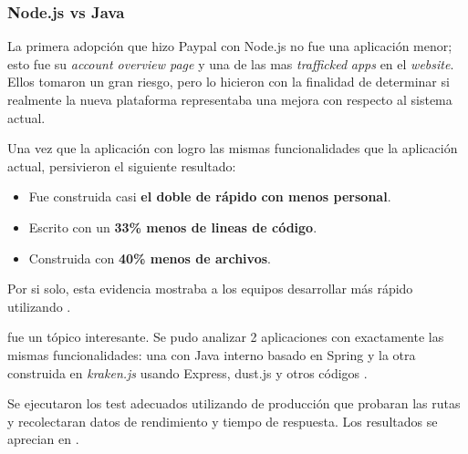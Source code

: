 \subsubsection{Node.js vs Java \cite{online_nodejs_paypal}}



La primera adopción que hizo Paypal con Node.js no fue una aplicación menor; esto fue su \textit{account overview page} y una de las mas \textit{trafficked} \textit{apps} en el \textit{website}. Ellos tomaron un gran riesgo, pero lo hicieron con la finalidad de determinar si realmente la nueva plataforma representaba una mejora con respecto al sistema actual.

Una vez que la aplicación con \nodejs logro las mismas funcionalidades que la aplicación actual, persivieron el siguiente resultado:

\begin{itemize}
\item Fue construida casi \textbf{el doble de rápido con menos personal}.
\item Escrito con un \textbf{33\% menos de lineas de código}.
\item Construida con \textbf{40\% menos de archivos}.
\end{itemize}

Por si solo, esta evidencia mostraba a los equipos desarrollar más rápido utilizando \javascript.

\performance fue un tópico interesante. Se pudo analizar 2 aplicaciones con exactamente las mismas funcionalidades: una con \framework Java interno basado en Spring y la otra construida en \textit{kraken.js} usando Express, dust.js y otros códigos \opensource.

Se ejecutaron los test adecuados utilizando \hardware de producción que probaran las rutas y recolectaran datos de rendimiento y tiempo de respuesta. Los resultados se aprecian en .

